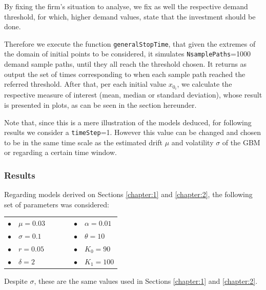 By fixing the firm's situation to analyse, we fix as well the respective demand threshold, for which, higher demand values, state that the investment should be done.

Therefore we execute the function \texttt{generalStopTime}, that given the extremes of the domain of initial points to be considered, it simulates \texttt{NsamplePaths}=1000 demand sample paths, until they all reach the threshold chosen. It returns as output the set of times corresponding to when each sample path reached the referred threshold.
After that, per each initial value $x_{0_i}$, we calculate the respective measure of interest (mean, median or standard deviation), whose result is presented in plots, as can be seen in the section hereunder.

Note that, since this is a mere illustration of the models deduced, for following results we consider a \texttt{timeStep}=1. However this value can be changed and chosen to be in the same time scale as the estimated drift $\mu$ and volatility $\sigma$ of the GBM or regarding a certain time window. 


\subsubsection{Results}

Regarding models derived on Sections \ref{chapter:1} and \ref{chapter:2}, the following set of parameters was considered:
\begin{table}[!htb]
	\centering
	\begin{tabular}{lllllll}
		$\bullet$ & $\mu=0.03$     &  & \hspace{7cm} &  &  $\bullet$ & $\alpha=0.01$ \\
		$\bullet$ & $\sigma=0.1$ &  & \hspace{7cm} &  &  $\bullet$ & $\theta=10$   \\
		$\bullet$ & $r=0.05$       &  & \hspace{7cm} &  &  $\bullet$ & $K_0=90$       \\
		$\bullet$ & $\delta=2$     &  & \hspace{7cm} & &  $\bullet$ & $K_1=100$  	\\                                
	\end{tabular}
\end{table}
Despite $\sigma$, these are the same values used in Sections \ref{chapter:1} and \ref{chapter:2}.

